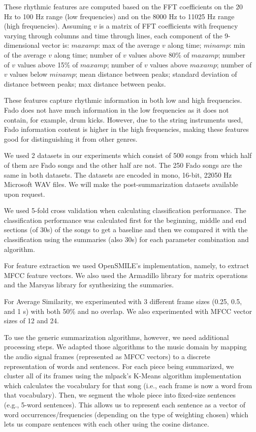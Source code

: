 \documentclass[11pt,onecolumn,draftcls]{IEEEtran}
\begin{document}
These rhythmic features are computed based on the \ac{FFT} coefficients on the
20 Hz to 100 Hz range (low frequencies) and on the 8000 Hz to 11025 Hz range (high
frequencies). Assuming $v$ is a matrix of FFT coefficients with frequency
varying through columns and time through lines, each component of the
9-dimensional vector is: $maxamp$: max of the average $v$ along time; $minamp$:
min of the average $v$ along time; number of $v$ values above 80\% of
$maxamp$; number of $v$ values above 15\% of $maxamp$; number of $v$ values
above $maxamp$; number of $v$ values below $minamp$; mean distance between
peaks; standard deviation of distance between peaks; max distance between
peaks.

These features capture rhythmic information in both low and high frequencies.
Fado does not have much information in the low frequencies as it does not
contain, for example, drum kicks. However, due to the string instruments used,
Fado information content is higher in the high frequencies, making these
features good for distinguishing it from other genres.

We used 2 datasets in our experiments which consist of 500 songs from which
half of them are Fado songs and the other half are not. The 250 Fado songs are
the same in both datasets. The datasets are encoded in mono, 16-bit, 22050 Hz
Microsoft WAV files. We will make the post-summarization datasets available upon request.

We used 5-fold cross validation when calculating classification performance. The
classification performance was calculated first for the beginning, middle and
end sections (of 30s) of the songs to get a baseline and then we compared it
with the classification using the summaries (also 30s) for each parameter
combination and algorithm.

For feature extraction we used OpenSMILE's \cite{opensmile2013} implementation,
namely, to extract \ac{MFCC} feature vectors. We also used the Armadillo
library \cite{armadillo2010} for matrix operations and the Marsyas
library \cite{marsyas1999} for synthesizing the summaries.

For Average Similarity, we experimented with 3 different frame sizes (0.25, 0.5,
and 1 s) with both 50\% and no overlap. We also experimented with \ac{MFCC}
vector sizes of 12 and 24.

To use the generic summarization algorithms, however, we need additional
processing steps. We adapted those algorithms to the music domain by mapping the
audio signal frames (represented as \ac{MFCC} vectors) to a discrete representation
of words and sentences. For each piece being summarized, we cluster all of its
frames using the mlpack's \cite{mlpack2013} K-Means algorithm implementation
which calculates the vocabulary for that song (i.e., each frame is now a word
from that vocabulary). Then, we segment the whole piece into fixed-size sentences
(e.g., 5-word sentences). This allows us to represent each sentence as a vector
of word occurrences/frequencies (depending on the type of weighting chosen)
which lets us compare sentences with each other using the cosine distance.
\end{document}
